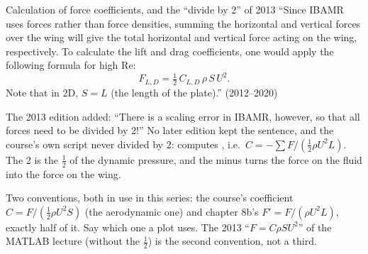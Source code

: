 \documentclass[aspectratio=169,11pt]{beamer}
\begin{document}
\begin{frame}{Calculation of force coefficients, and the ``divide by 2'' of 2013}
\label{fr:coeffs}
\small ``Since IBAMR uses forces rather than force densities, summing the horizontal and vertical forces over the wing will give the total horizontal and vertical force acting on the wing, respectively. To calculate the lift and drag coefficients, one would apply the following formula for high $\mathrm{Re}$:
\[
  F_{L,D} = \tfrac12\,C_{L,D}\,\rho\,S\,U^2 .
\]
Note that in 2D, $S = L$ (the length of the plate).'' (2012--2020)
\vspace{1mm}

\small The 2013 edition added: ``There is a scaling error in IBAMR, however, so that all forces need to be divided by 2!'' No later edition kept the sentence, and the course's own script never divided by 2:  computes , i.e.\ $C = -\sum F/(\frac12\rho U^2 L)$. The 2 is the $\frac12$ of the dynamic pressure, and the minus turns the force on the fluid into the force on the wing.
\vspace{1mm}
\begin{punchbox}
\footnotesize Two conventions, both in use in this series: the course's coefficient $C = F/(\frac12\rho U^2 S)$ (the aerodynamic one) and chapter 8b's $F' = F/(\rho U^2 L)$, exactly half of it. Say which one a plot uses. The 2013 ``$F = C\rho S U^2$'' of the MATLAB lecture (without the $\frac12$) is the second convention, not a third.
\end{punchbox}
\end{frame}
\end{document}
